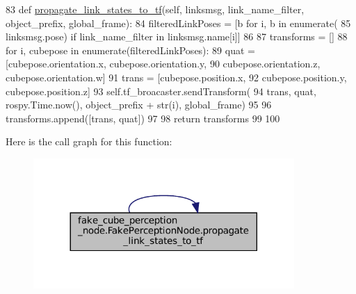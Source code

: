 \begin{DoxyCode}
83     \textcolor{keyword}{def }\hyperlink{classfake__cube__perception__node_1_1FakePerceptionNode_aeac788f768e625ecbe445c6af105d3f8}{propagate\_link\_states\_to\_tf}(self, linksmsg,  link\_name\_filter, 
      object\_prefix, global\_frame):
84         filteredLinkPoses = [b \textcolor{keywordflow}{for} i, b \textcolor{keywordflow}{in} enumerate(
85             linksmsg.pose) \textcolor{keywordflow}{if} link\_name\_filter \textcolor{keywordflow}{in} linksmsg.name[i]]
86 
87         transforms = []
88         \textcolor{keywordflow}{for} i, cubepose \textcolor{keywordflow}{in} enumerate(filteredLinkPoses):
89             quat = [cubepose.orientation.x, cubepose.orientation.y,
90                     cubepose.orientation.z, cubepose.orientation.w]
91             trans = [cubepose.position.x,
92                      cubepose.position.y, cubepose.position.z]
93             self.tf\_broacaster.sendTransform(
94                 trans, quat, rospy.Time.now(), object\_prefix + str(i), global\_frame)
95 
96             transforms.append([trans, quat])
97 
98         \textcolor{keywordflow}{return} transforms
99 
100 
\end{DoxyCode}
Here is the call graph for this function\+:
\nopagebreak
\begin{figure}[H]
\begin{center}
\leavevmode
\includegraphics[width=281pt]{classfake__cube__perception__node_1_1FakePerceptionNode_aeac788f768e625ecbe445c6af105d3f8_cgraph}
\end{center}
\end{figure}
\mbox{\label{classfake__cube__perception__node_1_1FakePerceptionNode_ac1127eae8d2eda994b22873529bd198f}} 
